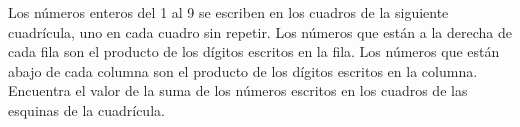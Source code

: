 Los números enteros del 1 al 9 se escriben en los cuadros de la siguiente cuadrícula, uno en cada cuadro sin repetir. Los números que están a la derecha de cada fila son el producto de los dígitos escritos en la fila. Los números que están abajo de cada columna son el producto de los dígitos escritos en la columna. Encuentra el valor de la suma de los números escritos en los cuadros de las esquinas de la cuadrícula.